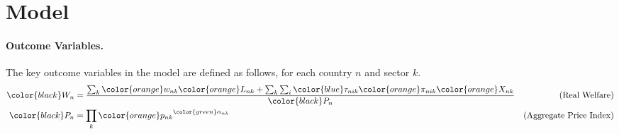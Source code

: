 \section{Model}
\paragraph{Outcome Variables.} The key outcome variables in the model are defined as follows, for each country $n$ and sector $k$.
\begin{align*}
    {\color{black}W_n} &= \frac{\sum_{k} {\color{orange}w_{nk}} {\color{orange}L_{nk}} + \sum_{k} \sum_{i} {\color{blue}\tau_{nik}} {\color{orange}\pi_{nik}} {\color{orange}X_{nk}}}{{\color{black}P_n}} & \text{(Real Welfare)} \\
    {\color{black}P_n} &= \prod_{k} {\color{orange}p_{nk}}^{{\color{green}\alpha_{nk}}} & \text{(Aggregate Price Index)}
\end{align*}

